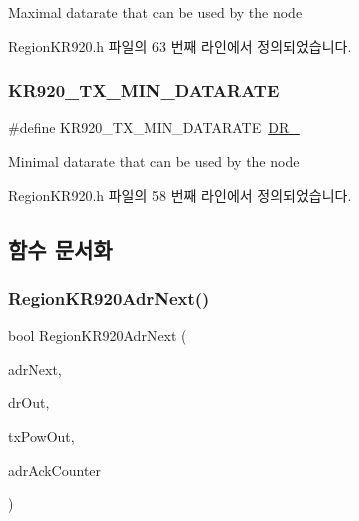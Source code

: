 Maximal datarate that can be used by the node 

Region\+K\+R920.\+h 파일의 63 번째 라인에서 정의되었습니다.

\mbox{\label{group___r_e_g_i_o_n_k_r920_ga9eff66e6e0242d6a7563dd346a56e3ab}} 
\subsubsection{\texorpdfstring{K\+R920\+\_\+\+T\+X\+\_\+\+M\+I\+N\+\_\+\+D\+A\+T\+A\+R\+A\+TE}{KR920\_TX\_MIN\_DATARATE}}
{\footnotesize\ttfamily \#define K\+R920\+\_\+\+T\+X\+\_\+\+M\+I\+N\+\_\+\+D\+A\+T\+A\+R\+A\+TE~\mbox{\hyperlink{group___r_e_g_i_o_n_ga6c4ef966b4f3d5eb7597b087f2b97095}{D\+R\+\_}}}

Minimal datarate that can be used by the node 

Region\+K\+R920.\+h 파일의 58 번째 라인에서 정의되었습니다.



\subsection{함수 문서화}
\mbox{\label{group___r_e_g_i_o_n_k_r920_gaf2fd635d699d384cf9e4342a583c5b8d}} 
\subsubsection{\texorpdfstring{Region\+K\+R920\+Adr\+Next()}{RegionKR920AdrNext()}}
{\footnotesize\ttfamily bool Region\+K\+R920\+Adr\+Next (\begin{DoxyParamCaption}\item[{\mbox{\hyperlink{group___r_e_g_i_o_n_ga567c2742622326b350b4e91bbf61b4ce}{Adr\+Next\+Params\+\_\+t}} $\ast$}]{adr\+Next,  }\item[{int8\+\_\+t $\ast$}]{dr\+Out,  }\item[{int8\+\_\+t $\ast$}]{tx\+Pow\+Out,  }\item[{uint32\+\_\+t $\ast$}]{adr\+Ack\+Counter }\end{DoxyParamCaption})}



